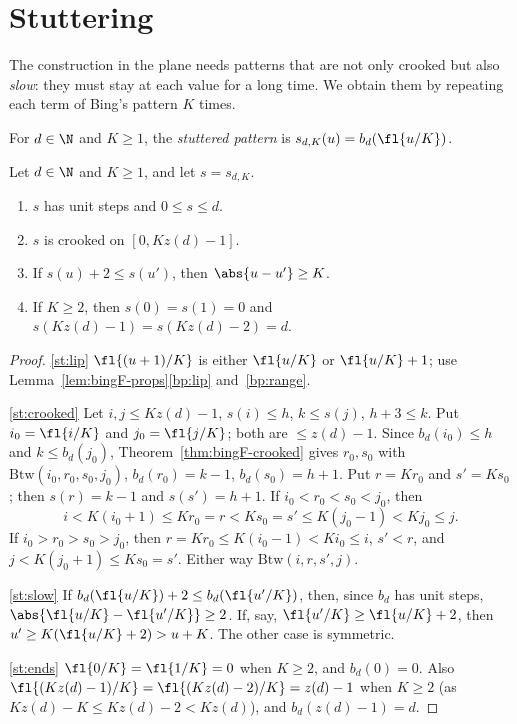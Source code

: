 
\section{Stuttering}

The construction in the plane needs patterns that are not only crooked but also \emph{slow}:
they must stay at each value for a long time. We obtain them by repeating each term of
Bing's pattern $K$ times.

\begin{definition}\label{def:stutter}
For $d\in\N$ and $K\ge1$, the \emph{stuttered pattern} is $s_{d,K}(u)=b_d(\fl{u/K})$.
\end{definition}


\begin{lemma}\label{lem:stutter}
Let $d\in\N$ and $K\ge1$, and let $s=s_{d,K}$.
\begin{enumerate}[label=(\alph*)]
\item\label{st:lip} $s$ has unit steps and $0\le s\le d$.
\item\label{st:crooked} $s$ is crooked on $[0,Kz(d)-1]$.
\item\label{st:slow} If $s(u)+2\le s(u')$, then $\abs{u-u'}\ge K$.
\item\label{st:ends} If $K\ge2$, then $s(0)=s(1)=0$ and $s(Kz(d)-1)=s(Kz(d)-2)=d$.
\end{enumerate}
\end{lemma}

\begin{proof}
\ref{st:lip} $\fl{(u+1)/K}$ is either $\fl{u/K}$ or $\fl{u/K}+1$; use
Lemma~\ref{lem:bingF-props}\ref{bp:lip} and~\ref{bp:range}.

\ref{st:crooked} Let $i,j\le Kz(d)-1$, $s(i)\le h$, $k\le s(j)$, $h+3\le k$. Put $i_0=\fl{i/K}$ and
$j_0=\fl{j/K}$; both are $\le z(d)-1$. Since $b_d(i_0)\le h$ and $k\le b_d(j_0)$,
Theorem~\ref{thm:bingF-crooked} gives $r_0,s_0$ with $\mathrm{Btw}(i_0,r_0,s_0,j_0)$,
$b_d(r_0)=k-1$, $b_d(s_0)=h+1$. Put $r=Kr_0$ and $s'=Ks_0$; then $s(r)=k-1$ and $s(s')=h+1$. If
$i_0<r_0<s_0<j_0$, then
\[
i<K(i_0+1)\le Kr_0=r<Ks_0=s'\le K(j_0-1)<Kj_0\le j .
\]
If $i_0>r_0>s_0>j_0$, then $r=Kr_0\le K(i_0-1)<Ki_0\le i$, $s'<r$, and $j<K(j_0+1)\le Ks_0=s'$.
Either way $\mathrm{Btw}(i,r,s',j)$.

\ref{st:slow} If $b_d(\fl{u/K})+2\le b_d(\fl{u'/K})$, then, since $b_d$ has unit steps,
$\abs{\fl{u/K}-\fl{u'/K}}\ge2$. If, say, $\fl{u'/K}\ge\fl{u/K}+2$, then $u'\ge K(\fl{u/K}+2)>u+K$.
The other case is symmetric.

\ref{st:ends} $\fl{0/K}=\fl{1/K}=0$ when $K\ge2$, and $b_d(0)=0$. Also
$\fl{(Kz(d)-1)/K}=\fl{(Kz(d)-2)/K}=z(d)-1$ when $K\ge2$ (as $Kz(d)-K\le Kz(d)-2<Kz(d)$), and
$b_d(z(d)-1)=d$.
\end{proof}

